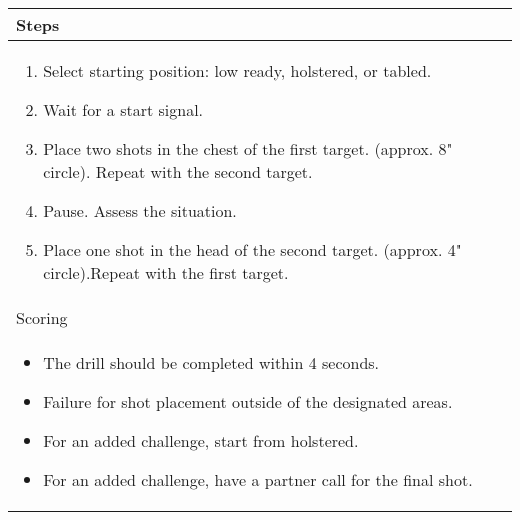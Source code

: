 \documentclass[../Cover.tex]{subfiles}
\begin{document}
	\begin{tabular}{ | p{} |}
		\hline
		Steps\\ 
		\hline
		\tiny \begin{enumerate}[topsep=0pt, partopsep=0pt]
			\item Select starting position: low ready, holstered, or tabled. 
			\item Wait for a start signal. 
			\item Place two shots in the chest of the first target. (approx. 8" circle).  Repeat with the second target.
			\item Pause. Assess the situation.
			\item Place one shot in the head of the second target. (approx. 4" circle).Repeat with the first target.
		\end{enumerate}		
		\\ [0.25\textheight]
		\hline
		Scoring \\
		\hline
		\tiny \begin{itemize}[topsep=0pt, partopsep=0pt]
			\item The drill should be completed within 4 seconds.
			\item Failure for shot placement outside of the designated areas.
			\item For an added challenge, start from holstered.
			\item For an added challenge, have a partner call for the final shot.
		\end{itemize}		
		\\ [0.2\textheight]
		\hline
	\end{tabular}
\end{document}
